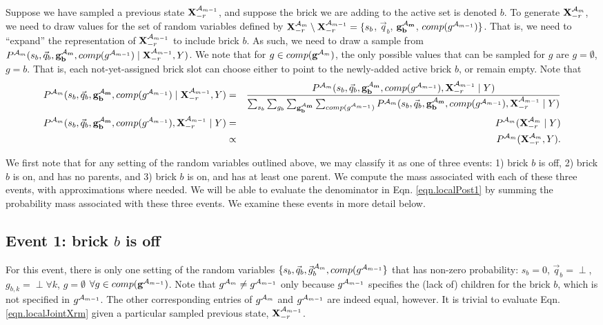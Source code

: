 \documentclass[11pt]{article}
\newcommand{\A}{{\cal A}}
\newcommand{\X}{\mathbf{X}}
\newcommand{\Xrm}{\X^{\Am}_{-r}}
\newcommand{\Am}{\A_{m}}
\newcommand{\gcomp}{comp(\mathbf{g}^{\Am})}
\newcommand{\gcompPrev}{comp(\mathbf{g}^{\A_{m-1}})}
\newcommand{\qb}{\vec{q}_b}
\begin{document}
Suppose we have sampled a previous state $\X^{\A_{m-1}}_{-r}$, and suppose the brick we are adding to the active set is denoted $b$. To generate $\Xrm$, we need to draw values for the set of random variables defined by $\Xrm \setminus \X^{\A_{m-1}}_{-r} = \{s_b$, $\qb$, $\mathbf{g^{\Am}_b}$, $comp(g^{\A_{m-1}})\}$. That is, we need to ``expand'' the representation of $\X^{\A_{m-1}}_{-r}$ to include brick $b$. As such, we need to draw a sample from $P^{\Am}(s_b, \qb, \mathbf{g^{\Am}_b}, comp(g^{\A_{m-1}}) \mid \X^{\A_{m-1}}_{-r}, Y)$. We note that for $g \in \gcomp$, the only possible values that can be sampled for $g$ are $g = \emptyset$, $g= b$. That is, each not-yet-assigned brick slot can choose either to point to the newly-added active brick $b$, or remain empty. Note that
\begin{eqnarray}
	P^{\Am}(s_b, \qb, \mathbf{g^{\Am}_b}, comp(g^{\A_{m-1}}) \mid \X^{\A_{m-1}}_{-r}, Y) &=& \frac{P^{\Am}(s_b, \qb, \mathbf{g^{\Am}_b}, comp(g^{\A_{m-1}}), \X^{\A_{m-1}}_{-r} \mid Y)}{\sum_{s_b} \sum_{g_b}\sum_{\mathbf{g^{\Am}_b}}\sum_{comp(g^{\A_{m-1}})} P^{\Am}(s_b, \qb, \mathbf{g^{\Am}_b}, comp(g^{\A_{m-1}}), \X^{\A_{m-1}}_{-r} \mid Y)} \label{eqn.localPost1} \\
P^{\Am}(s_b, \qb, \mathbf{g^{\Am}_b}, comp(g^{\A_{m-1}}), \X^{\A_{m-1}}_{-r} \mid Y) &=& P^{\Am}(\Xrm \mid Y) \\
&\propto& P^{\Am}(\Xrm, Y). \label{eqn.localPost}
\end{eqnarray}

We first note that for any setting of the random variables outlined above, we may classify it as one of three events: 1) brick $b$ is off, 2) brick $b$ is on, and has no parents, and 3) brick $b$ is on, and has at least one parent. We compute the mass associated with each of these three events, with approximations where needed. We will be able to evaluate the denominator in Eqn. \ref{eqn.localPost1} by summing the probability mass associated with these three events. We examine these events in more detail below.

\subsection*{Event 1: brick $b$ is off}

For this event, there is only one setting of the random variables $\{s_b, \qb, \vec{g}^{\Am}_b, comp(g^{\A_{m-1}}\}$ that has non-zero probability: $s_b = 0$, $\qb = \perp$, $g_{b,k} = \perp \forall k$, $g = \emptyset$ $\forall g \in \gcompPrev$. Note that $g^{\A_{m}} \neq g^{\A_{m-1}}$ only because $g^{\A_{m-1}}$ specifies the (lack of) children for the brick $b$, which is not specified in $g^{\A_{m-1}}$. The other corresponding entries of $g^{\A_{m}}$ and $g^{\A_{m-1}}$ are indeed equal, however. It is trivial to evaluate Eqn. \ref{eqn.localJointXrm} given a particular sampled previous state, $\X^{\A_{m-1}}_{-r}$.
\end{document}
